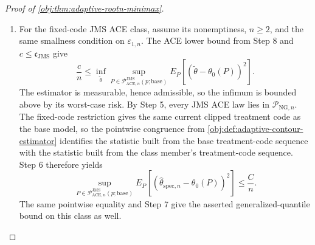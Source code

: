 \documentclass[11pt]{article}
\begin{document}
\begin{proof}[Proof of \cref{obj:thm:adaptive-rootn-minimax}]
\begin{enumerate}
\item For the fixed-code JMS ACE class, assume its nonemptiness, \(n\ge2\), and the same smallness condition on \(\varepsilon_{1,n}\).  The ACE lower bound from Step 8 and \(c\le\mathfrak c_{\mathrm{JMS}}\) give
\[
\frac{c}{n}
\le
\inf_{\widetilde\theta}
\sup_{P\in\mathcal P_{\mathrm{ACE},n}^{\mathrm{JMS}}(p;\mathrm{base})}
E_P\!\left[
(\widetilde\theta-\theta_0(P))^2
\right].
\]
The estimator is measurable, hence admissible, so the infimum is bounded above by its worst-case risk.  By Step 5, every JMS ACE law lies in \(\mathcal P_{\mathrm{NG},n}\).  The fixed-code restriction gives the same current clipped treatment code as the base model, so the pointwise congruence from \cref{obj:def:adaptive-contour-estimator} identifies the statistic built from the base treatment-code sequence with the statistic built from the class member's treatment-code sequence.  Step 6 therefore yields
\[
\sup_{P\in\mathcal P_{\mathrm{ACE},n}^{\mathrm{JMS}}(p;\mathrm{base})}
E_P\!\left[
(\widehat\theta_{\mathrm{spec},n}-\theta_0(P))^2
\right]
\le
\frac{C}{n}.
\]
The same pointwise equality and Step 7 give the asserted generalized-quantile bound on this class as well. %
\end{enumerate}
\end{proof}
\end{document}
